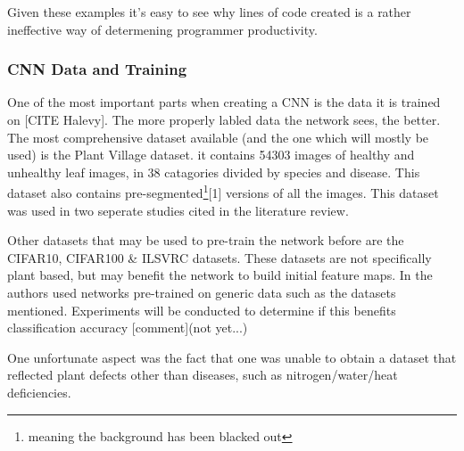       Given these examples it's easy to see why lines of code created is a rather ineffective way of determening programmer productivity.

    \subsubsection{CNN Data and Training}
      One of the most important parts when creating a CNN is the data it is trained on [CITE Halevy]. The more properly labled data the network sees, the better. The most comprehensive dataset available (and the one which will mostly be used) is the Plant Village dataset. it contains 54303 images of healthy and unhealthy leaf images, in 38 catagories divided by species and disease. This dataset also contains pre-segmented\footnote{meaning the background has been blacked out}[1] versions of all the images. This dataset was used in two seperate studies cited in the literature review.
      \par
      Other datasets that may be used to pre-train the network before are the CIFAR10, CIFAR100 \& ILSVRC datasets. These datasets are not specifically plant based, but may benefit the network to build initial feature maps. In \cite{Choi} the authors used networks pre-trained on generic data such as the datasets mentioned. Experiments will be conducted to determine if this benefits classification accuracy [comment](not yet...)
      \par
      One unfortunate aspect was the fact that one was unable to obtain a dataset that reflected plant defects other than diseases, such as nitrogen/water/heat deficiencies.


